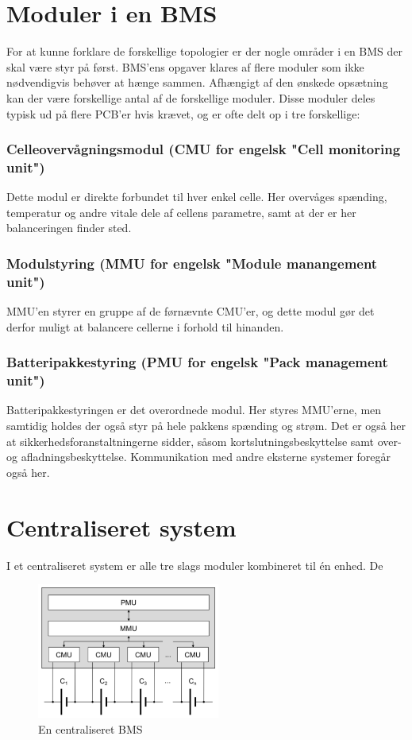 \section{Moduler i en BMS}
For at kunne forklare de forskellige topologier er der nogle områder i en BMS der skal være styr på først. BMS'ens opgaver klares af flere moduler som ikke nødvendigvis behøver at hænge sammen. Afhængigt af den ønskede opsætning kan der være forskellige antal af de forskellige moduler. Disse moduler deles typisk ud på flere PCB'er hvis krævet, og er ofte delt op i tre forskellige: 

\subsubsection{Celleovervågningsmodul (CMU for engelsk "Cell monitoring unit")}
Dette modul er direkte forbundet til hver enkel celle. Her overvåges spænding, temperatur og andre vitale dele af cellens parametre, samt at der er her balanceringen finder sted. 

\subsubsection{Modulstyring (MMU for engelsk "Module manangement unit")}
MMU'en styrer en gruppe af de førnævnte CMU'er, og dette modul gør det derfor muligt at balancere cellerne i forhold til hinanden. 

\subsubsection{Batteripakkestyring (PMU for engelsk "Pack management unit")}
Batteripakkestyringen er det overordnede modul. Her styres MMU'erne, men samtidig holdes der også styr på hele pakkens spænding og strøm. Det er også her at sikkerhedsforanstaltningerne sidder, såsom kortslutningsbeskyttelse samt over- og afladningsbeskyttelse. Kommunikation med andre eksterne systemer foregår også her. 

\section{Centraliseret system}
I et centraliseret system er alle tre slags moduler kombineret til én enhed. De

\begin{figure}[h]
	\centering
	\includegraphics[width=6cm]{billeder/centralized.png}
	\caption{En centraliseret BMS}
	\label{fig:centralized_BMS}
\end{figure}

